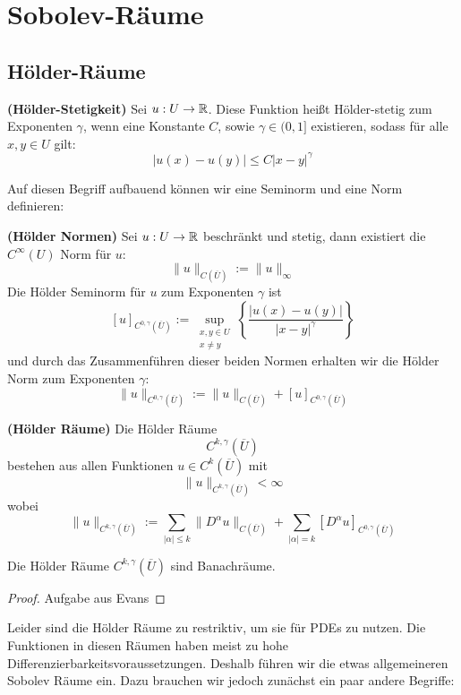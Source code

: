 \chapter{Sobolev-Räume}
\section{Hölder-Räume}

\begin{definition} \textbf{(Hölder-Stetigkeit)}\enter
	Sei $u:U\rightarrow\mathbb{R}$. Diese Funktion heißt Hölder-stetig zum Exponenten $\gamma$, wenn eine Konstante $C$, sowie $\gamma\in(0,1]$ existieren, sodass für alle $x,y\in U$ gilt:
	\[|u(x)-u(y)| \leq C|x-y|^\gamma\]
\end{definition}

 Auf diesen Begriff aufbauend können wir eine Seminorm und eine Norm definieren:

 \begin{definition} \textbf{(Hölder Normen)}\enter
	 Sei $u:U\rightarrow\mathbb{R}$ beschränkt und stetig, dann existiert die $C^\infty(U)$ Norm für $u$:
	 \[\|u\|_{C(\overline{U})}:=\|u\|_\infty\]
	 Die Hölder Seminorm für $u$ zum Exponenten $\gamma$ ist
	 \[\left[u\right]_{C^{0,\gamma}(\overline{U})}:=
	 \sup\limits_{\substack{x,y\in U \\ x\neq y}}\left\{ \frac{|u(x)-u(y)|}{|x-y|^\gamma}\right\}\]
	und durch das Zusammenführen dieser beiden Normen erhalten wir die Hölder Norm zum Exponenten $\gamma$:
	\[\|u\|_{C^{0,\gamma}(\overline{U})}:=\|u\|_{C(\overline{U})}+\left[u\right]_{C^{0,\gamma}(\overline{U})}\]
\end{definition}

\begin{definition}\textbf{(Hölder Räume)}\enter
	Die Hölder Räume 
	\[C^{k,\gamma}(\overline{U})\]
	bestehen aus allen Funktionen $u\in C^k(\overline{U})$ mit
	\[\|u\|_{C^{k,\gamma}(\overline{U})}<\infty\]
	wobei
	\[\|u\|_{C^{k,\gamma}(\overline{U})}:=
		\sum\limits_{|\alpha|\leq k}\|D^\alpha u\|_{C(\overline{U})}
	+\sum\limits_{|\alpha|=k}\left[D^\alpha u\right]_{C^{0,\gamma}(\overline{U})}\]
\end{definition}

\begin{satz}
	Die Hölder Räume $C^{k,\gamma}(\overline{U})$ sind Banachräume.
\end{satz}
\begin{proof}
	Aufgabe aus Evans
\end{proof}

Leider sind die Hölder Räume zu restriktiv, um sie für PDEs zu nutzen. Die Funktionen in diesen Räumen haben meist zu hohe Differenzierbarkeitsvoraussetzungen. Deshalb führen wir die etwas allgemeineren Sobolev Räume ein. Dazu brauchen wir jedoch zunächst ein paar andere Begriffe:

